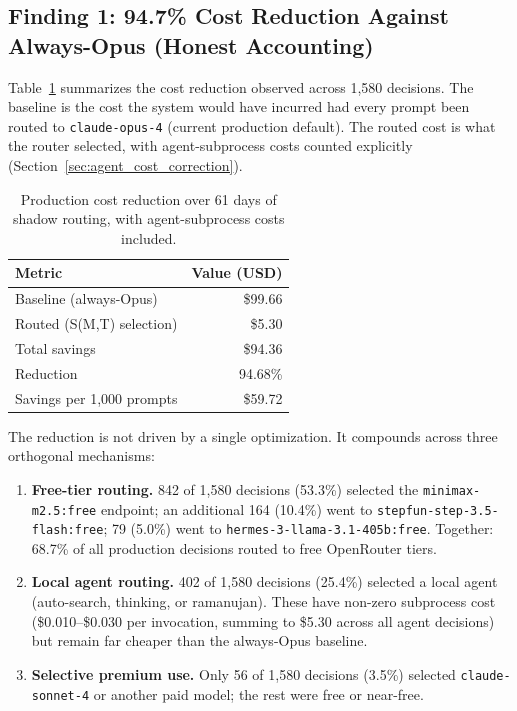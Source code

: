 \subsection{Finding 1: 94.7\% Cost Reduction Against Always-Opus (Honest Accounting)}

Table~\ref{tab:production_cost} summarizes the cost reduction observed across 1{,}580 decisions. The baseline is the cost the system would have incurred had every prompt been routed to \texttt{claude-opus-4} (current production default). The routed cost is what the router selected, with agent-subprocess costs counted explicitly (Section~\ref{sec:agent_cost_correction}).

\begin{table}[h]
\centering
\caption{Production cost reduction over 61 days of shadow routing, with agent-subprocess costs included.}
\label{tab:production_cost}
\small
\begin{tabular}{lr}
\toprule
\textbf{Metric} & \textbf{Value (USD)} \\
\midrule
Baseline (always-Opus) & \$99.66 \\
Routed (S(M,T) selection) & \$5.30 \\
\midrule
Total savings & \$94.36 \\
Reduction & 94.68\% \\
Savings per 1{,}000 prompts & \$59.72 \\
\bottomrule
\end{tabular}
\end{table}

The reduction is not driven by a single optimization. It compounds across three orthogonal mechanisms:

\begin{enumerate}
    \item \textbf{Free-tier routing.} 842 of 1{,}580 decisions (53.3\%) selected the \texttt{minimax-m2.5:free} endpoint; an additional 164 (10.4\%) went to \texttt{stepfun-step-3.5-flash:free}; 79 (5.0\%) went to \texttt{hermes-3-llama-3.1-405b:free}. Together: 68.7\% of all production decisions routed to free OpenRouter tiers.
    \item \textbf{Local agent routing.} 402 of 1{,}580 decisions (25.4\%) selected a local agent (auto-search, thinking, or ramanujan). These have non-zero subprocess cost (\$0.010--\$0.030 per invocation, summing to \$5.30 across all agent decisions) but remain far cheaper than the always-Opus baseline.
    \item \textbf{Selective premium use.} Only 56 of 1{,}580 decisions (3.5\%) selected \texttt{claude-sonnet-4} or another paid model; the rest were free or near-free.
\end{enumerate}

